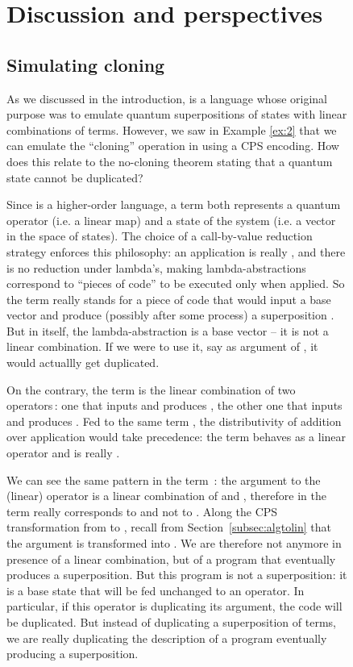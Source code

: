 \documentclass{LMCS}
\begin{document}
\begin{figure}
{\section{Discussion and perspectives}\label{sec:concl}

\subsection{Simulating cloning}
As we discussed in the introduction,  is a language whose
original purpose was to emulate quantum superpositions of states with
linear combinations of terms. However, we saw in Example \ref{ex:2}
that we can emulate the ``cloning'' operation
 in
 using a CPS encoding. How does this relate to the no-cloning
theorem \cite{WoottersZurekNATURE82} stating that a quantum state
cannot be duplicated?

Since  is a higher-order
language, a term both represents a quantum operator (i.e. a linear
map) and a state of the system (i.e. a vector in the space of states).
The choice of a call-by-value reduction strategy enforces this
philosophy: an application  is really ,
and there is no reduction under lambda's, making lambda-abstractions
correspond to ``pieces of code'' to be executed only when applied. So
the term  really stands for a piece of code that
would input a base vector  and produce (possibly after some
process) a superposition . But in itself, the lambda-abstraction
is a base vector -- it is not a linear combination. If we were to use
it, say as argument of , it would
actuallly get duplicated.

On the contrary, the term  is the linear
combination of two operators\,: one that inputs  and produces ,
the other one that inputs  and produces . Fed to the same term
, the distributivity of addition
over application would take precedence: the term  behaves as a
linear operator and  is really
.

We can see the same pattern in the term \,:
the argument to the (linear) operator  is a linear
combination of  and , therefore in  the term
 really corresponds to  and not to .  Along the CPS
transformation from  to , recall from
Section~\ref{subsec:algtolin} that the argument  is
transformed into . We are
therefore not anymore in presence of a linear combination, but of
a program that eventually produces a superposition. But this program
is not a superposition: it is a base state that will be fed unchanged
to an operator. In particular, if this operator is duplicating its
argument, the code  will be
duplicated. But instead of duplicating a superposition of terms, we
are really duplicating the description of a program eventually
producing a superposition.


}
\end{figure}
\end{document}
